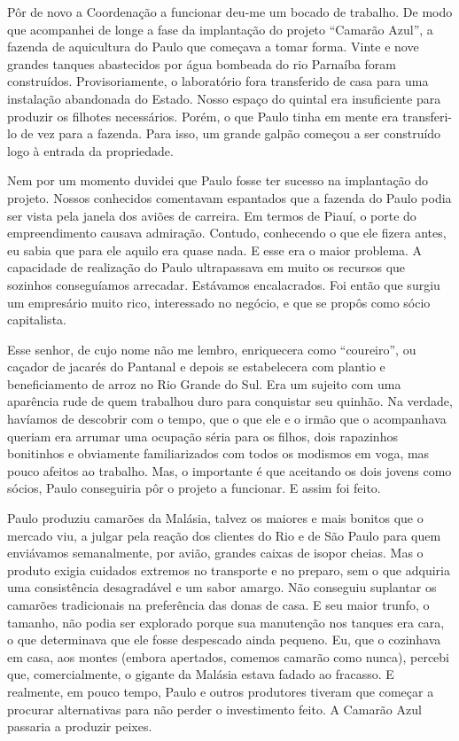 Pôr de novo a Coordenação a funcionar deu-me um bocado de trabalho.
De modo que acompanhei de longe a fase da implantação do projeto ``Camarão Azul'', a fazenda de aquicultura do Paulo que começava a tomar forma.
Vinte e nove grandes tanques abastecidos por água bombeada do rio Parnaíba foram construídos.
Provisoriamente, o laboratório fora transferido de casa para uma instalação abandonada do Estado.
Nosso espaço do quintal era insuficiente para produzir os filhotes necessários.
Porém, o que Paulo tinha em mente era transferi-lo de vez para a fazenda.
Para isso, um grande galpão começou a ser construído logo à entrada da propriedade.

Nem por um momento duvidei que Paulo fosse ter sucesso na implantação do projeto.
Nossos conhecidos comentavam espantados que a fazenda do Paulo podia ser vista pela janela dos aviões de carreira.
Em termos de Piauí, o porte do empreendimento causava admiração.
Contudo, conhecendo o que ele fizera antes, eu sabia que para ele aquilo era quase nada.
E esse era o maior problema.
A capacidade de realização do Paulo ultrapassava em muito os recursos que sozinhos conseguíamos arrecadar.
Estávamos encalacrados.
Foi então que surgiu um empresário muito rico, interessado no negócio, e que se propôs como sócio capitalista.

Esse senhor, de cujo nome não me lembro, enriquecera como ``coureiro'', ou caçador de jacarés do Pantanal e depois se estabelecera com plantio e beneficiamento de arroz no Rio Grande do Sul.
Era um sujeito com uma aparência rude de quem trabalhou duro para conquistar seu quinhão.
Na verdade, havíamos de descobrir com o tempo, que o que ele e o irmão que o acompanhava queriam era arrumar uma ocupação séria para os filhos, dois rapazinhos bonitinhos e obviamente familiarizados com todos os modismos em voga, mas pouco afeitos ao trabalho.
Mas, o importante é que aceitando os dois jovens como sócios, Paulo conseguiria pôr o projeto a funcionar.
E assim foi feito.

Paulo produziu camarões da Malásia, talvez os maiores e mais bonitos que o mercado viu, a julgar pela reação dos clientes do Rio e de São Paulo para quem enviávamos semanalmente, por avião, grandes caixas de isopor cheias.
Mas o produto exigia cuidados extremos no transporte e no preparo, sem o que adquiria uma consistência desagradável e um sabor amargo.
Não conseguiu suplantar os camarões tradicionais na preferência das donas de casa.
E seu maior trunfo, o tamanho, não podia ser explorado porque sua manutenção nos tanques era cara, o que determinava que ele fosse despescado ainda pequeno.
Eu, que o cozinhava em casa, aos montes (embora apertados, comemos camarão como nunca), percebi que, comercialmente, o gigante da Malásia estava fadado ao fracasso.
E realmente, em pouco tempo, Paulo e outros produtores tiveram que começar a procurar alternativas para não perder o investimento feito.
A Camarão Azul passaria a produzir peixes.


